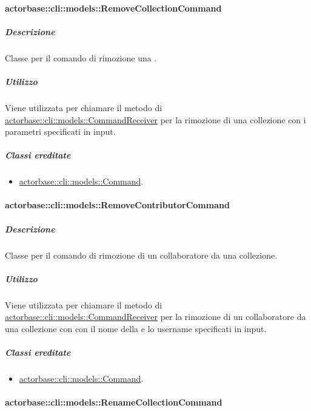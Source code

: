 \documentclass{scalatekids-article}
\begin{document}
\paragraph{actorbase::cli::models::RemoveCollectionCommand}
\label{sec:actorbase::cli::models::RemoveCollectionCommand}

\subparagraph{Descrizione}

Classe per il comando di rimozione una .

\subparagraph{Utilizzo}

Viene utilizzata per chiamare il metodo di
\hyperref[sec:actorbase::cli::models::CommandReceiver]{actorbase::cli::models::CommandReceiver} per la rimozione di una collezione con
i parametri specificati in input.

\subparagraph{Classi ereditate}

\begin{itemize}
\item \hyperref[sec:actorbase::cli::models::Command]{actorbase::cli::models::Command}.
\end{itemize}

\paragraph{actorbase::cli::models::RemoveContributorCommand}
\label{sec:actorbase::cli::models::RemoveContributorCommand}

\subparagraph{Descrizione}

Classe per il comando di rimozione di un collaboratore da una collezione.

\subparagraph{Utilizzo}

Viene utilizzata per chiamare il metodo di
\hyperref[sec:actorbase::cli::models::CommandReceiver]{actorbase::cli::models::CommandReceiver} per la rimozione di un collaboratore
da una collezione con con il nome della  e lo username
specificati in input.

\subparagraph{Classi ereditate}

\begin{itemize}
\item \hyperref[sec:actorbase::cli::models::Command]{actorbase::cli::models::Command}.
\end{itemize}

\paragraph{actorbase::cli::models::RenameCollectionCommand}
\label{sec:actorbase::cli::models::RenameCollectionCommand}
\end{document}
